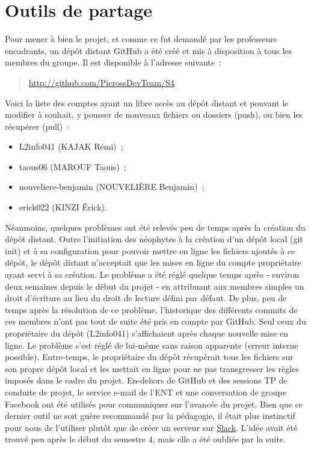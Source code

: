 \documentclass[a4paper,11pt]{article}
\begin{document}
\section{Outils de partage}
\label{section:outils_partage}
Pour mener à bien le projet, et comme ce fut demandé par les professeurs encadrants, un dépôt distant GitHub a été créé et mis à disposition à tous les membres du groupe. Il est disponible à l'adresse suivante~:
\begin{quote}\medbreak
	\href{http://github.com/PicrossDevTeam/S4}{http://github.com/PicrossDevTeam/S4}
\end{quote}\bigbreak
Voici la liste des comptes ayant un libre accès au dépôt distant et pouvant le modifier à souhait, y pousser de nouveaux fichiers ou dossiers (push), ou bien les récupérer (pull)~:\medbreak
\begin{itemize}[label=$\square$]
	\item L2info041 (KAJAK Rémi)~;
	\item taous06 (MAROUF Taous)~;
	\item nouveliere-benjamin (NOUVELIÈRE Benjamin)~;
	\item erick022 (KINZI Érick).
\end{itemize}\bigbreak
Néanmoins, quelques problèmes ont été relevés peu de temps après la création du dépôt distant. Outre l'initiation des néophytes à la création d'un dépôt local (git init) et à sa configuration pour pouvoir mettre en ligne les fichiers ajoutés à ce dépôt, le dépôt distant n'acceptait que les mises en ligne du compte propriétaire ayant servi à sa création. Le problème a été réglé quelque temps après - environ deux semaines depuis le début du projet - en attribuant aux membres simples un droit d'écriture au lieu du droit de lecture défini par défaut.\bigbreak
De plus, peu de temps après la résolution de ce problème, l'historique des différents commits de ces membres n'ont pas tout de suite été pris en compte par GitHub. Seul ceux du propriétaire du dépôt (L2info041) s'affichaient après chaque nouvelle mise en ligne. Le problème s'est réglé de lui-même sans raison apparente (erreur interne possible). Entre-temps, le propriétaire du dépôt récupérait tous les fichiers sur son propre dépôt local et les mettait en ligne pour ne pas transgresser les règles imposés dans le cadre du projet.\bigbreak
En-dehors de GitHub et des sessions TP de conduite de projet, le service e-mail de l'ENT et une conversation de groupe Facebook ont été utilisés pour communiquer sur l'avancée du projet. Bien que ce dernier outil ne soit guère recommandé par la pédagogie, il était plus instinctif pour nous de l'utiliser plutôt que de créer un serveur sur  \href{https://slack.com/intl/fr-fr}{Slack}. L'idée avait été trouvé peu après le début du semestre 4, mais elle a été oubliée par la suite.
\newpage
\end{document}
